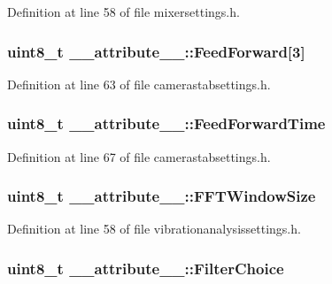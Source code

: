 \-Definition at line 58 of file mixersettings.\-h.

\hypertarget{struct____attribute_____a24cfdad488d1a6d10171eb8e81b7d8db}{
\subsubsection[{\-Feed\-Forward}]{\setlength{\rightskip}{0pt plus 5cm}uint8\-\_\-t {\bf \-\_\-\-\_\-attribute\-\_\-\-\_\-\-::\-Feed\-Forward}\mbox{[}3\mbox{]}}}\label{struct____attribute_____a24cfdad488d1a6d10171eb8e81b7d8db}


\-Definition at line 63 of file camerastabsettings.\-h.

\hypertarget{struct____attribute_____ab1a9990587c4dfa9b74466bf169ae8e4}{
\subsubsection[{\-Feed\-Forward\-Time}]{\setlength{\rightskip}{0pt plus 5cm}uint8\-\_\-t {\bf \-\_\-\-\_\-attribute\-\_\-\-\_\-\-::\-Feed\-Forward\-Time}}}\label{struct____attribute_____ab1a9990587c4dfa9b74466bf169ae8e4}


\-Definition at line 67 of file camerastabsettings.\-h.

\hypertarget{struct____attribute_____a44cd306f5e509bd08cb8a4d457a7636e}{
\subsubsection[{\-F\-F\-T\-Window\-Size}]{\setlength{\rightskip}{0pt plus 5cm}uint8\-\_\-t {\bf \-\_\-\-\_\-attribute\-\_\-\-\_\-\-::\-F\-F\-T\-Window\-Size}}}\label{struct____attribute_____a44cd306f5e509bd08cb8a4d457a7636e}


\-Definition at line 58 of file vibrationanalysissettings.\-h.

\hypertarget{struct____attribute_____a05c15fc8f9c8b1bb1cb0d430e91f8917}{
\subsubsection[{\-Filter\-Choice}]{\setlength{\rightskip}{0pt plus 5cm}uint8\-\_\-t {\bf \-\_\-\-\_\-attribute\-\_\-\-\_\-\-::\-Filter\-Choice}}}\label{struct____attribute_____a05c15fc8f9c8b1bb1cb0d430e91f8917}


